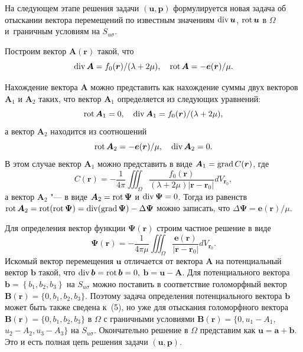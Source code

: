 На следующем этапе решения  задачи $(\boldsymbol{u}, \boldsymbol{p})$ формулируется новая задача  об отыскании 
 вектора  перемещений  по известным значениям $\mathop{\rm div} \boldsymbol{u}$, $\mathop{\rm rot} \boldsymbol{u}$ в $\Omega $ и~граничным условиям на $S_{u\sigma}$.

Построим вектор  $\boldsymbol{A}(\boldsymbol{r})$ такой, что
$$\mathop{\rm div} \boldsymbol{A}=f_{0}(\boldsymbol{r})/(\lambda+2\mu), \quad
\mathop{\rm rot} \boldsymbol{A}=-\boldsymbol{e}(\boldsymbol{r})/\mu .$$

Нахождение вектора  $\boldsymbol{A}$ можно представить как нахождение суммы двух векторов 
$\boldsymbol{A}_{1} $ и $\boldsymbol{A}_{2}$ таких, что  вектор $\boldsymbol A_{1}$ определяется из следующих уравнений:
$$ \mathop{\rm rot} \boldsymbol A_{1}=0, 
\quad 
\mathop{\rm div} \boldsymbol A_{1}=f_{0}(\boldsymbol r)/(\lambda+2\mu),$$
 а вектор  $\boldsymbol A_{2}$ находится из соотношений
 $$\mathop{\rm rot} \boldsymbol A_{2}=-\boldsymbol {e}(\boldsymbol r)/\mu, \quad \mathop{\rm div} \boldsymbol{A}_2=0.$$
В этом случае вектор $\boldsymbol A_1$ можно представить в виде 
$\boldsymbol{A}_{1}= \mathop{\rm grad} C(\boldsymbol r ) $, где
$$  C(\boldsymbol r)=-\frac {1}{4\pi} \iiint_{\Omega}
\frac {f_{0}(\boldsymbol r)}{(\lambda+2\mu)|\boldsymbol r -\boldsymbol r_{0}|}dV_{\boldsymbol r_{0}} ,$$
а вектор $\boldsymbol A_{2}$ "--- в виде $\boldsymbol A_{2}=\mathop{\rm rot} \boldsymbol\Psi $ 
и $\mathop{\rm div} \boldsymbol\Psi =0$. 
Тогда из равенств $\mathop{\rm rot} \boldsymbol A_{2}= \mathop{\rm rot}(\mathop{\rm rot} \boldsymbol \Psi ) = \mathop{\rm div}(\mathop{\rm grad} \boldsymbol \Psi )  -\Delta \boldsymbol\Psi$
 можно записать, что  $\Delta \boldsymbol\Psi = \boldsymbol e(\boldsymbol r)/\mu$.
 
Для определения вектор функции $\boldsymbol\Psi(\boldsymbol r)$  строим частное решение в виде
$$
\boldsymbol\Psi(\boldsymbol r)=-\frac {1}{4\pi\mu} \iiint_{\Omega}\frac {\boldsymbol e (\boldsymbol r)}{|\boldsymbol r -\boldsymbol r_{0}|}dV_{\boldsymbol r_{0}} .$$
Искомый вектор перемещения $\boldsymbol u$  отличается от вектора $\boldsymbol A$  на потенциальный вектор  $\boldsymbol{b}$ такой, что $
\mathop{\rm div} \boldsymbol{b}=\mathop{\rm rot} \boldsymbol{b}=0,$
$\boldsymbol{b}=\boldsymbol{u}-\boldsymbol{A}.
$
Для потенциального вектора  $\boldsymbol b=\left\{ b_{1}, b_{2}, b_3\right\}$ на $S_{u\sigma}$ %
можно поставить в соответствие голоморфный вектор $\boldsymbol B(\boldsymbol r)=\{0, b_{1}, b_{2}, b_{3}\}$.
Поэтому задача определения потенциального вектора $\boldsymbol b$ может быть также сведена
к~(5), но уже для отыскания голоморфного вектора  $\boldsymbol B(\boldsymbol r)=\{0, b_{1}, b_{2}, b_{3}\}$ в $\Omega$ 
 с граничными условиями $\boldsymbol{B}(\boldsymbol{r})=\{0, u_{1}-A_{1},$ $ u_{2}-A_{2}, u_{3}-A_{3}\}$ на $S_{u\sigma}$. 
Окончательно решение в $\Omega$ представим как  $\boldsymbol{u}=\boldsymbol{a}+\boldsymbol{b}$.  Это и есть полная цепь решения 
задачи $(\boldsymbol{u}, \boldsymbol{p})$.

